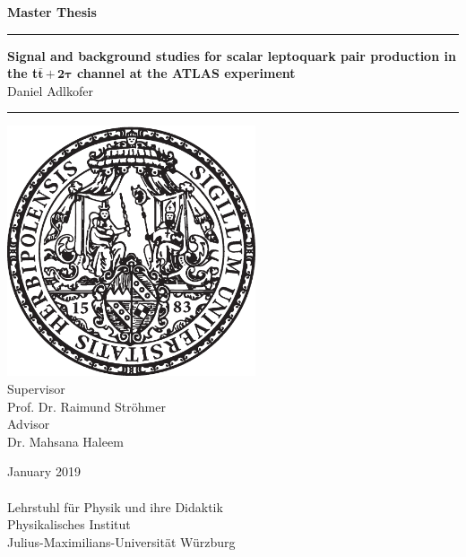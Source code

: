\begin{titlepage}
  \vspace*{-7\baselineskip}
	\enlargethispage{100mm}
		\begin{center}
		\LARGE{\textbf{Master Thesis}\\}
		\vspace{3mm}	
		\textcolor{royalazure}{\noindent\rule{\textwidth}{3pt}}
		\huge{\textbf{Signal and background studies for scalar leptoquark pair production in the t$\bar{\textbf{t}}\,\mathbf{+\,2\tau}$ channel at the ATLAS experiment}\\}
		\vspace{3mm}
		\Large{Daniel Adlkofer\\}
		\textcolor{royalazure}{\noindent\rule{\textwidth}{3pt}}
		\vspace{3mm}
        \includegraphics[width=0.55\textwidth]{figures/neuSIEGEL.eps} \\
		\vspace{3mm}
		Supervisor \\
		\Large{Prof. Dr. Raimund Str\"{o}hmer\\}
               	\vspace{3mm}
                Advisor \\
    \Large{Dr. Mahsana Haleem\\}
               	\vspace{3mm}

		\vspace{5mm}
		January 2019\\
		  \noindent\hrulefill\\
		\vspace{3mm}
 		Lehrstuhl f\"{u}r Physik und ihre Didaktik\\
 		Physikalisches Institut\\
	    Julius-Maximilians-Universit\"{a}t W\"{u}rzburg
	\end{center}
\end{titlepage}
\cleardoubleoddemptypage
